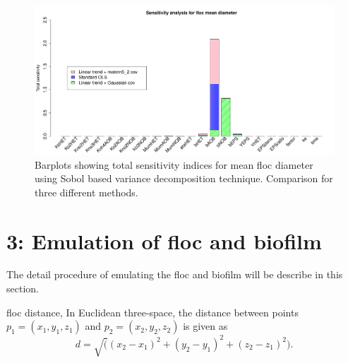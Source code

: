 \documentclass[12pt,titlepage]{report}
\theoremstyle{definition}
\theoremstyle{remark}
\begin{document}
\begin{figure}[!ht] 
\includegraphics[width=1.1\textwidth]{ana/sensitivty_results}
\caption[]{Barplots showing total sensitivity indices for mean floc diameter using Sobol based variance decomposition technique. Comparison for three different methods.}\label{sens}
\end{figure}


\chapter{3: Emulation of floc and biofilm}
The detail procedure of emulating the floc and biofilm will be describe in this section.

floc distance, In Euclidean three-space, the distance between points $p_1=(x_1,y_1,z_1)$ and  $p_2=(x_2,y_2,z_2)$ is given as
\begin{equation}
 d=\sqrt((x_2-x_1)^2+(y_2-y_1)^2+(z_2-z_1)^2). 
\end{equation}
\end{document}
